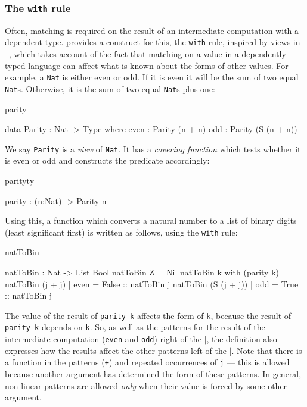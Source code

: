 \subsubsection{The \texttt{with} rule}

Often, matching is required on the result of an intermediate computation
with a dependent type.
\Idris{} provides a construct for this, the \texttt{with} rule, 
inspired by views in \Epigram~\cite{McBride2004a},
which takes account of the
fact that matching on a value in a dependently-typed language can affect what
is known about the forms of other values. 
%
For example, a \texttt{Nat} is either even or odd. 
If it is even it will
be the sum of two equal \texttt{Nat}s. Otherwise, it is the sum of two equal \texttt{Nat}s 
plus one:

\begin{SaveVerbatim}{parity}

data Parity : Nat -> Type where
   even : Parity (n + n)
   odd  : Parity (S (n + n))

\end{SaveVerbatim}

\noindent
We say \texttt{Parity} is a \emph{view} of \texttt{Nat}. 
It has a \emph{covering function} which tests whether
it is even or odd and constructs the predicate accordingly:

\begin{SaveVerbatim}{parityty}

parity : (n:Nat) -> Parity n

\end{SaveVerbatim}

\noindent
Using this, a function which converts a natural number to a list
of binary digits (least significant first) is written as follows, using the \texttt{with}
rule:

\begin{SaveVerbatim}{natToBin}

natToBin : Nat -> List Bool
natToBin Z = Nil
natToBin k with (parity k)
   natToBin (j + j)     | even = False :: natToBin j
   natToBin (S (j + j)) | odd  = True  :: natToBin j

\end{SaveVerbatim}

\noindent
The value of the result of \texttt{parity k} affects the form of \texttt{k}, 
because the result
of \texttt{parity k} depends on \texttt{k}. 
So, as well as the patterns for the result of the
intermediate computation (\texttt{even} and \texttt{odd}) right of the 
\texttt{$\mid$}, the definition also expresses how
the results affect the other patterns left of the $\mid$. Note that there is a
function in the patterns (\texttt{+}) and repeated occurrences of \texttt{j} --- 
this is allowed
because another argument has determined the form of these patterns. In general,
non-linear patterns are allowed \emph{only} when their value is forced by
some other argument.


